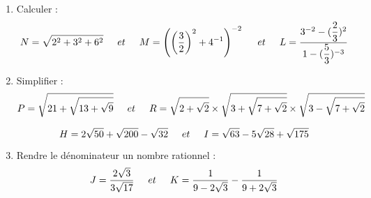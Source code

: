 \documentclass[a4paper,12pt]{article}
\begin{document}
\begin{exo}
\begin{enumerate}
\item Calculer :
\[
N=\sqrt{2^{2}+3^{2}+6^{2}}\hspace*{0.5cm}et\hspace*{0.5cm}
M=\left( \left( \dfrac{3}{2}\right)^{2}+4^{-1}\right)^{-2}  \hspace*{0.5cm}et\hspace*{0.5cm}
L=\dfrac{3^{-2}-(\dfrac{2}{3})^{2}}{1-(\dfrac{5}{3})^{-3}}
\]
\item Simplifier :
\[
P=\sqrt{21+\sqrt{13+\sqrt{9}}}\hspace*{0.5cm}et\hspace*{0.5cm}
R=\sqrt{2+\sqrt{2}}\times \sqrt{3+\sqrt{7+\sqrt{2}}}\times \sqrt{3-\sqrt{7+\sqrt{2}}}
\]

\[
H=2\sqrt{50}+\sqrt{200}-\sqrt{32}\hspace*{0.5 cm}et\hspace*{0.5 cm}
I=\sqrt{63}-5\sqrt{28}+\sqrt{175}
\]
\item Rendre le dénominateur un nombre rationnel :
\[
J=\dfrac{2\sqrt{3}}{3\sqrt{17}}\hspace*{0.5 cm}et\hspace*{0.5 cm}
K=\dfrac{1}{9-2\sqrt{3}}-\dfrac{1}{9+2\sqrt{3}}
\]
\end{enumerate}
\end{exo}
\end{document}
